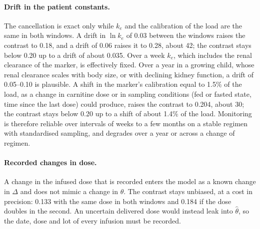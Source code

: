 \paragraph{Drift in the patient constants.} The cancellation is exact only while $k_e$ and the
calibration of the load are the same in both windows. A drift in $\ln k_e$ of 0.03 between the
windows raises the contrast to 0.18, and a drift of 0.06 raises it to 0.28, about 42\um; the
contrast stays below 0.20 up to a drift of about 0.035. Over a week $k_e$, which includes the
renal clearance of the marker, is effectively fixed. Over a year in a growing child, whose renal
clearance scales with body size, or with declining kidney function, a drift of 0.05--0.10 is
plausible. A shift in the marker's calibration equal to 1.5\% of the load, as a change in
carnitine dose or in sampling conditions (fed or fasted state, time since the last dose) could
produce, raises the contrast to 0.204, about 30\um; the contrast stays below 0.20 up to a shift of
about 1.4\% of the load. Monitoring is therefore reliable over intervals of weeks to a few months
on a stable regimen with standardised sampling, and degrades over a year or across a change of
regimen.

\paragraph{Recorded changes in dose.} A change in the infused dose that is recorded enters the
model as a known change in $\Delta$ and does not mimic a change in $\theta$. The contrast stays
unbiased, at a cost in precision: 0.133 with the same dose in both windows and 0.184 if the dose
doubles in the second. An uncertain delivered dose would instead leak into $\hat\theta$, so the
date, dose and lot of every infusion must be recorded.

